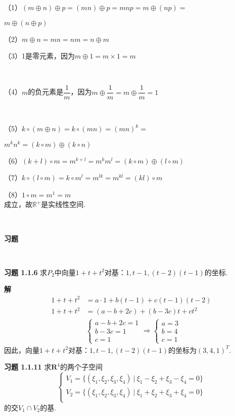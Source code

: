 \documentclass[12pt, a4paper, oneside, fontset=none]{ctexart}
\begin{document}
（1）$(m \oplus n) \oplus p = (mn) \oplus p = mnp = m \oplus (np) = $ \\
\centerline{$m \oplus (n \oplus p)$} \par
（2）$m \oplus n = mn = nm = n \oplus m$ \par
（3）1是零元素，因为$m \oplus 1 = m \times 1 = m$ \par \ \par
（4）$m$的负元素是$\dfrac{1}{m}$，因为$m \oplus \dfrac{1}{m} = m \oplus \dfrac{1}{m} = 1$ \par \ \par
（5）$k \circ (m \oplus n) = k \circ (mn) = (mn)^k = $ \\
\centerline{$m^kn^k = (k \circ m) \oplus (k \circ n)$} \par
（6）$(k + l) \circ m = m^{k + l} = m^km^l = (k \circ m) \oplus (l \circ m)$ \par
（7）$k \circ (l \circ m) = k \circ m^l = m^{lk} = m^{kl} = (kl) \circ m$ \par
（8）$1 \circ m = m^1 = m$ \\
成立，故$\mathbb{R^+}$是实线性空间. \par \ \par

\centerline{\large{\textbf{习题}}} \ \par

\textbf{习题 1.1.6} \quad 求$P_2$中向量$1+t+t^2$对基：$1, t - 1, (t - 2)(t - 1)$的坐标.

\textbf{解}
\begin{align*}
    1 + t + t^2 & = a \cdot 1 + b(t - 1) + c(t - 1)(t - 2) \\
    1 + t + t^2 & = (a - b + 2c) + (b - 3c)t + ct^2        \\
                & \begin{cases}
                      a - b + 2c = 1 \\
                      b - 3c = 1     \\
                      c = 1
                  \end{cases} \Rightarrow
    \begin{cases}
        a = 3 \\
        b = 4 \\
        c = 1
    \end{cases}
\end{align*}
因此，向量$1+t+t^2$对基：$1, t - 1, (t - 2)(t - 1)$的坐标为$(3, 4, 1)^T$.

\textbf{习题 1.1.11} \quad 求$\mathbf{R}^4$的两个子空间
$$
    \begin{cases}
        V_1 = \{(\xi_1, \xi_2, \xi_3, \xi_4) \ | \ \xi_1 - \xi_2 + \xi_3 - \xi_4 = 0 \} \\
        V_2 = \{(\xi_1, \xi_2, \xi_3, \xi_4) \ | \ \xi_1 + \xi_2 + \xi_3 + \xi_4 = 0 \} \\
    \end{cases}
$$
的交$V_1 \cap V_2$的基.
\end{document}
